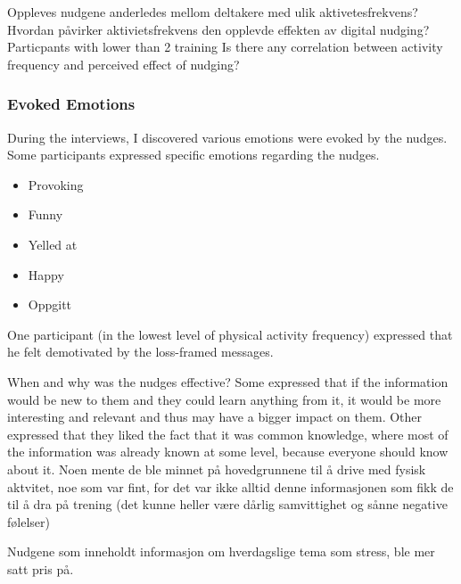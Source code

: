 Oppleves nudgene anderledes mellom deltakere med ulik aktivetesfrekvens? 
Hvordan påvirker aktivietsfrekvens den opplevde effekten av digital nudging?
Particpants with lower than 2 training 
Is there any correlation between activity frequency and perceived effect of nudging?

\subsubsection{Evoked Emotions}
During the interviews, I discovered various emotions were evoked by the nudges. Some participants expressed specific emotions regarding the nudges. 
\begin{itemize}
\item Provoking
\item Funny
\item Yelled at
\item Happy
\item Oppgitt
\end{itemize}

One participant (in the lowest level of physical activity frequency) expressed that he felt demotivated by the loss-framed messages. 

When and why was the nudges effective?
Some expressed that if the information would be new to them and they could learn anything from it, it would be more interesting and relevant and thus may have a bigger impact on them.
Other expressed that they liked the fact that it was common knowledge, where most of the information was already known at some level, because everyone should know about it. 
Noen mente de ble minnet på hovedgrunnene til å drive med fysisk aktvitet, noe som var fint, for det var ikke alltid denne informasjonen som fikk de til å dra på trening (det kunne heller være dårlig samvittighet og sånne negative følelser)

Nudgene som inneholdt informasjon om hverdagslige tema som stress, ble mer satt pris på. 







